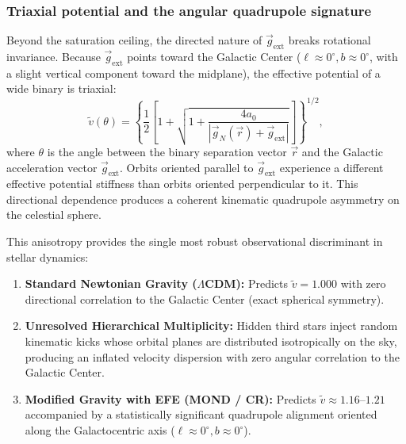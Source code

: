\documentclass[aps,prd,reprint,superscriptaddress,nofootinbib,floatfix,amsmath,amssymb]{revtex4-2}
\begin{document}
\subsubsection{Triaxial potential and the angular quadrupole signature}
Beyond the saturation ceiling, the directed nature of $\vec{g}_{\text{ext}}$ breaks rotational invariance. Because $\vec{g}_{\text{ext}}$ points toward the Galactic Center ($\ell \approx 0^\circ, b \approx 0^\circ$, with a slight vertical component toward the midplane), the effective potential of a wide binary is triaxial:
\begin{equation}
\tilde{v}(\theta) = \left\{ \frac{1}{2} \left[ 1 + \sqrt{1 + \frac{4 a_0}{|\vec{g}_N(\vec{r}) + \vec{g}_{\text{ext}}|}} \right] \right\}^{1/2},
\end{equation}
where $\theta$ is the angle between the binary separation vector $\vec{r}$ and the Galactic acceleration vector $\vec{g}_{\text{ext}}$. Orbits oriented parallel to $\vec{g}_{\text{ext}}$ experience a different effective potential stiffness than orbits oriented perpendicular to it. This directional dependence produces a coherent kinematic quadrupole asymmetry on the celestial sphere.

This anisotropy provides the single most robust observational discriminant in stellar dynamics:
\begin{enumerate}
\item \textbf{Standard Newtonian Gravity ($\Lambda$CDM):} Predicts $\tilde{v} = 1.000$ with zero directional correlation to the Galactic Center (exact spherical symmetry).
\item \textbf{Unresolved Hierarchical Multiplicity:} Hidden third stars inject random kinematic kicks whose orbital planes are distributed isotropically on the sky, producing an inflated velocity dispersion with zero angular correlation to the Galactic Center.
\item \textbf{Modified Gravity with EFE (MOND / CR):} Predicts $\tilde{v} \approx 1.16\text{--}1.21$ accompanied by a statistically significant quadrupole alignment oriented along the Galactocentric axis ($\ell \approx 0^\circ, b \approx 0^\circ$).
\end{enumerate}
\end{document}
